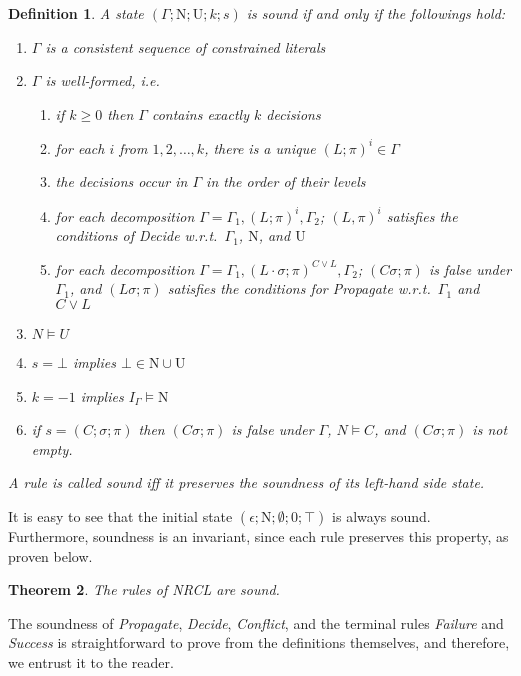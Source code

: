 \documentclass[a4paper]{article}
\newcommand{\startproof}{{\bf Proof:~}}
\newtheorem{defi}{Definition}[section]
\newtheorem{theo}[defi]{Theorem}
\begin{document}
\begin{defi}\label{sndstatedef}
A state $(\Gamma; \text{N}; \text{U}; k; s)$ is \emph{sound} if and only if the followings hold:
	\begin{enumerate}
		\item $\Gamma$ is a consistent sequence of constrained literals
		\item $\Gamma$ is \emph{well-formed}, i.e.\
			\begin{enumerate}
				\item if $k \geq 0$ then $\Gamma$ contains exactly $k$ decisions
				\item for each $i$ from $1, 2, \dots, k$, there is a unique $(L; \pi)^i\in\Gamma$
				\item the decisions occur in $\Gamma$ in the order of their levels
				\item for each decomposition $\Gamma = \Gamma_1, (L; \pi)^i, \Gamma_2$; $(L, \pi)^i$ satisfies the conditions of \emph{Decide} w.r.t.\
					$\Gamma_1$, $\text{N}$, and $\text{U}$
				\item for each decomposition $\Gamma = \Gamma_1, (L\cdot\sigma; \pi)^{C\lor L}, \Gamma_2$; 
								$(C\sigma; \pi)$ is false under $\Gamma_1$, 
								and $(L\sigma; \pi)$ satisfies the conditions for \emph{Propagate} w.r.t.\
								$\Gamma_1$ and $C\lor L$
			\end{enumerate}	
		\item $N \models U$
		\item $s = \bot$ implies $\bot \in \text{N}\cup\text{U}$
		\item $k = -1$ implies $I_{\Gamma}\models \text{N}$
		\item if $s = (C; \sigma; \pi)$ then 
			      $(C\sigma; \pi)$ is false under $\Gamma$, $N \models C$, and $(C\sigma; \pi)$ is not empty.
	\end{enumerate}
	A rule is called \emph{sound} iff it preserves the soundness of its left-hand side state.
\end{defi}

It is easy to see that the initial state $(\epsilon; \text{N}; \emptyset; 0; \top)$ is always sound.
Furthermore, soundness is an invariant, since each rule preserves this property, as proven below.

\begin{theo}\label{sndrulesTheo}
The rules of NRCL are sound.
\end{theo}
\noindent\startproof
The soundness of \emph{Propagate}, \emph{Decide}, \emph{Conflict}, and 
the terminal rules \emph{Failure} and \emph{Success} is straightforward 
to prove from the definitions themselves, and therefore, we entrust it to the reader.
\end{document}
